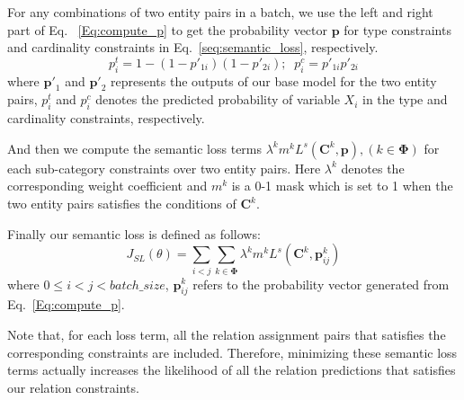 
For any combinations of two entity pairs in a batch, we use the left and right part of Eq. ~\ref{Eq:compute_p} to get the probability vector $\bm{p}$ for type constraints and cardinality constraints in Eq.~\ref{seq:semantic_loss}, respectively.
\begin{equation}
\label{Eq:compute_p}
p_{i}^{t} = 1-(1-p'_{1i})(1-p'_{2i});\;\; p_{i}^{c} = p'_{1i}p'_{2i}
\end{equation}
where $\bm{p'}_1$ and $\bm{p'}_2$ represents the outputs of our base model for the two entity pairs,
$p_{i}^{t}$ and $p_{i}^{c}$ denotes the predicted probability of variable $X_i$ in the type and cardinality constraints, respectively.

And then we compute the semantic loss terms $\lambda ^{k}m^{k}L^{s}(\bm{C}^{k}, \bm{p}), (k \in \bm{\Phi})$ for each sub-category constraints over two entity pairs.
Here $\lambda^{k}$ denotes the corresponding weight coefficient and $m^{k}$ is a 0-1 mask which is set to 1 when the two entity pairs satisfies the conditions of $\bm{C}^{k}$.

Finally our semantic loss is defined as follows:
\begin{equation}
	J_{SL}(\theta) = \sum\limits_{i < j}{\sum_{k\in \bm{\Phi}}{\lambda ^{k}m^{k}L^{s}(\bm{C}^{k}, \bm{p}_{ij}^{k})}}
\end{equation}
where $0\leq i < j < batch\_size$,
$\bm{p}_{ij}^{k} $ refers to the probability vector generated from Eq.~\ref{Eq:compute_p}.

Note that, for each loss term, all the relation assignment pairs that satisfies the corresponding constraints are included.
Therefore, minimizing these semantic loss terms actually increases the likelihood of all the relation predictions that satisfies our relation constraints.

